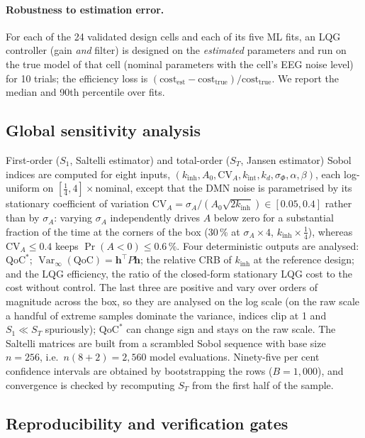 \documentclass[12pt,a4paper]{article}
\theoremstyle{plain}
\theoremstyle{definition}
\theoremstyle{remark}
\newcommand{\QoC}{\mathrm{QoC}}
\newcommand{\kinh}{k_{\mathrm{inh}}}
\newcommand{\kint}{k_{\mathrm{int}}}
\newcommand{\kd}{k_{d}}
\newcommand{\sA}{\sigma_{A}}
\newcommand{\sPhi}{\sigma_{\Phi}}
\newcommand{\Var}{\operatorname{Var}}
\newcommand{\hv}{\mathbf{h}}
\begin{document}
\paragraph{Robustness to estimation error.} For each of the 24 validated design cells and each of its five ML fits, an LQG controller (gain \emph{and} filter) is designed on the \emph{estimated} parameters and run on the true model of that cell (nominal parameters with the cell's EEG noise level) for 10 trials; the efficiency loss is $(\mathrm{cost}_{\mathrm{est}}-\mathrm{cost}_{\mathrm{true}})/\mathrm{cost}_{\mathrm{true}}$. We report the median and 90th percentile over fits.

\subsection{Global sensitivity analysis}
\label{sec:sobol-methods}

First-order ($S_1$, Saltelli estimator) and total-order ($S_T$, Jansen estimator) Sobol indices \citep{Sobol1993,Jansen1999,Saltelli2010} are computed for eight inputs, $(\kinh,A_0,\mathrm{CV}_A,\kint,\kd,\sPhi,\alpha,\beta)$, each log-uniform on $[\tfrac14,4]\times$nominal, except that the DMN noise is parametrised by its stationary coefficient of variation $\mathrm{CV}_A=\sA/(A_0\sqrt{2\kinh})\in[0.05,0.4]$ rather than by $\sA$: varying $\sA$ independently drives $A$ below zero for a substantial fraction of the time at the corners of the box (30\,\% at $\sA\times4$, $\kinh\times\tfrac14$), whereas $\mathrm{CV}_A\le0.4$ keeps $\Pr(A<0)\le0.6\,\%$. Four deterministic outputs are analysed: $\QoC^*$; $\Var_\infty(\QoC)=\hv^\top P\hv$; the relative CRB of $\kinh$ at the reference design; and the LQG efficiency, the ratio of the closed-form stationary LQG cost to the cost without control. The last three are positive and vary over orders of magnitude across the box, so they are analysed on the log scale (on the raw scale a handful of extreme samples dominate the variance, indices clip at 1 and $S_1\ll S_T$ spuriously); $\QoC^*$ can change sign and stays on the raw scale. The Saltelli matrices are built from a scrambled Sobol sequence \citep{Owen1998} with base size $n=256$, i.e.\ $n(8+2)=2{,}560$ model evaluations. Ninety-five per cent confidence intervals are obtained by bootstrapping the rows ($B=1{,}000$), and convergence is checked by recomputing $S_T$ from the first half of the sample.

\subsection{Reproducibility and verification gates}
\label{sec:repro}
\end{document}
